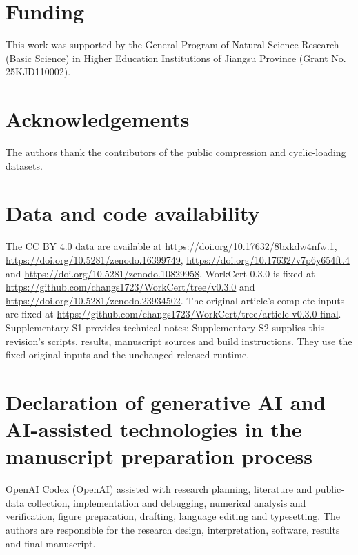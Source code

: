 \documentclass[preprint,12pt,a4paper]{elsarticle}
\begin{document}
\section*{Funding}
This work was supported by the General Program of Natural Science Research (Basic Science) in Higher Education Institutions of Jiangsu Province (Grant No. 25KJD110002).
\section*{Acknowledgements}
The authors thank the contributors of the public compression and cyclic-loading datasets.
\section*{Data and code availability}
The CC BY 4.0 data are available at \url{https://doi.org/10.17632/8bxkdw4nfw.1}, \url{https://doi.org/10.5281/zenodo.16399749}, \url{https://doi.org/10.17632/v7p6y654ft.4} and \url{https://doi.org/10.5281/zenodo.10829958}. WorkCert 0.3.0 is fixed at \url{https://github.com/changs1723/WorkCert/tree/v0.3.0} and \url{https://doi.org/10.5281/zenodo.23934502}. The original article's complete inputs are fixed at \url{https://github.com/changs1723/WorkCert/tree/article-v0.3.0-final}. Supplementary S1 provides technical notes; Supplementary S2 supplies this revision's scripts, results, manuscript sources and build instructions. They use the fixed original inputs and the unchanged released runtime.
\section*{Declaration of generative AI and AI-assisted technologies in the manuscript preparation process}
OpenAI Codex (OpenAI) assisted with research planning, literature and public-data collection, implementation and debugging, numerical analysis and verification, figure preparation, drafting, language editing and typesetting. The authors are responsible for the research design, interpretation, software, results and final manuscript.
{\small}
\end{document}
